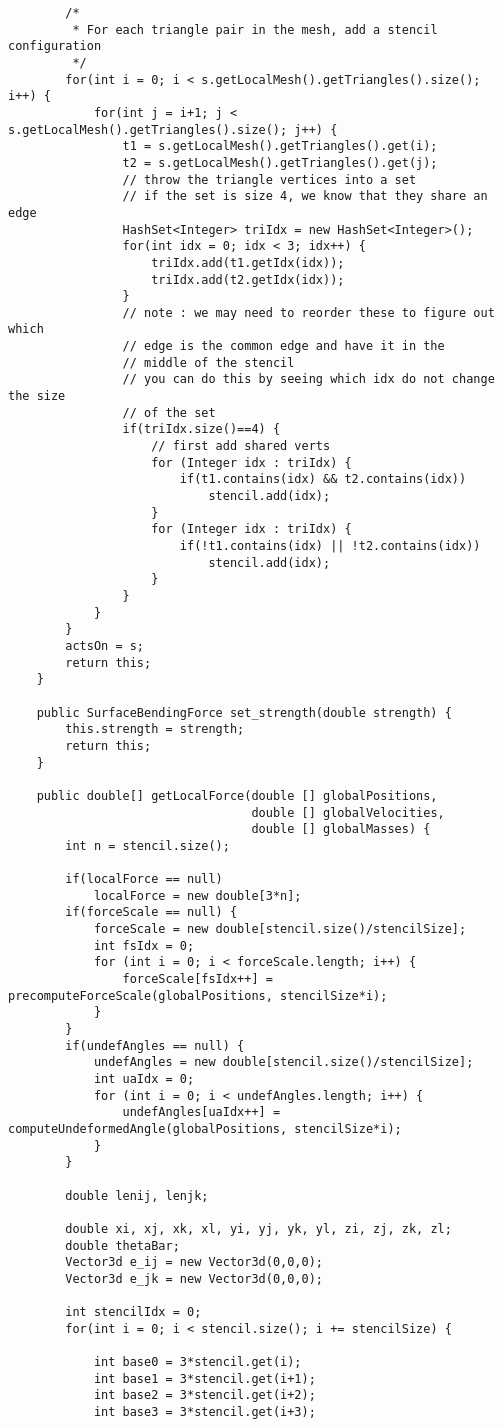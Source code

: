\begin{lstlisting}
		/*
		 * For each triangle pair in the mesh, add a stencil configuration
		 */
		for(int i = 0; i < s.getLocalMesh().getTriangles().size(); i++) {
			for(int j = i+1; j < s.getLocalMesh().getTriangles().size(); j++) {
				t1 = s.getLocalMesh().getTriangles().get(i);
				t2 = s.getLocalMesh().getTriangles().get(j);
				// throw the triangle vertices into a set
				// if the set is size 4, we know that they share an edge 
				HashSet<Integer> triIdx = new HashSet<Integer>();
				for(int idx = 0; idx < 3; idx++) {
					triIdx.add(t1.getIdx(idx));
					triIdx.add(t2.getIdx(idx));
				}
				// note : we may need to reorder these to figure out which
				// edge is the common edge and have it in the 
				// middle of the stencil
				// you can do this by seeing which idx do not change the size
				// of the set
				if(triIdx.size()==4) {
					// first add shared verts
					for (Integer idx : triIdx) {
						if(t1.contains(idx) && t2.contains(idx))
							stencil.add(idx);
					}
					for (Integer idx : triIdx) {
						if(!t1.contains(idx) || !t2.contains(idx))
							stencil.add(idx);
					}
				}
			}
		}
		actsOn = s;
		return this;
    }

    public SurfaceBendingForce set_strength(double strength) {
		this.strength = strength;
		return this;
    }
	
	public double[] getLocalForce(double [] globalPositions,
								  double [] globalVelocities,
								  double [] globalMasses) {
		int n = stencil.size();
		
		if(localForce == null)
			localForce = new double[3*n];
		if(forceScale == null) {
			forceScale = new double[stencil.size()/stencilSize];
			int fsIdx = 0;
			for (int i = 0; i < forceScale.length; i++) {
				forceScale[fsIdx++] = precomputeForceScale(globalPositions, stencilSize*i);
			}
		}
		if(undefAngles == null) {
			undefAngles = new double[stencil.size()/stencilSize];
			int uaIdx = 0;
			for (int i = 0; i < undefAngles.length; i++) {
				undefAngles[uaIdx++] = computeUndeformedAngle(globalPositions, stencilSize*i);
			}
		}
		
		double lenij, lenjk;
		
		double xi, xj, xk, xl, yi, yj, yk, yl, zi, zj, zk, zl;
		double thetaBar;
		Vector3d e_ij = new Vector3d(0,0,0);
		Vector3d e_jk = new Vector3d(0,0,0);
		
		int stencilIdx = 0;
		for(int i = 0; i < stencil.size(); i += stencilSize) {
				
			int base0 = 3*stencil.get(i);
			int base1 = 3*stencil.get(i+1);
			int base2 = 3*stencil.get(i+2);
			int base3 = 3*stencil.get(i+3);
		

\end{lstlisting}
